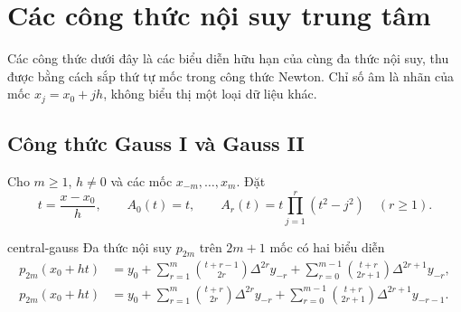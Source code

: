 \documentclass[12pt,a4paper,oneside]{book}
\numberwithin{algorithm}{chapter}
\theoremstyle{definition}
\begin{document}
\section{Các công thức nội suy trung tâm}
Các công thức dưới đây là các biểu diễn hữu hạn của cùng đa thức nội suy, thu được bằng cách sắp thứ tự mốc trong công thức Newton. Chỉ số âm là nhãn của mốc $x_j=x_0+jh$, không biểu thị một loại dữ liệu khác.
\subsection{Công thức Gauss I và Gauss II}
Cho $m\geq1$, $h\ne0$ và các mốc $x_{-m},\ldots,x_m$. Đặt
\[
 t=\frac{x-x_0}{h},\qquad A_0(t)=t,\qquad
 A_r(t)=t\prod_{j=1}^{r}(t^2-j^2)\quad(r\geq1).
\]
\begin{dinhly}{}{central-gauss}
Đa thức nội suy $p_{2m}$ trên $2m+1$ mốc có hai biểu diễn
\begin{align}
 p_{2m}(x_0+ht)
 &=y_0+\sum_{r=1}^{m}\binom{t+r-1}{2r}\Delta^{2r}y_{-r}
 +\sum_{r=0}^{m-1}\binom{t+r}{2r+1}\Delta^{2r+1}y_{-r},
 \label{eq:central-gauss1}\\
 p_{2m}(x_0+ht)
 &=y_0+\sum_{r=1}^{m}\binom{t+r}{2r}\Delta^{2r}y_{-r}
 +\sum_{r=0}^{m-1}\binom{t+r}{2r+1}\Delta^{2r+1}y_{-r-1}.
 \label{eq:central-gauss2}
\end{align}
\end{dinhly}
\end{document}
